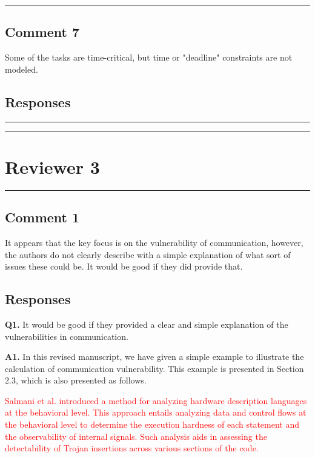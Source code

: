 \documentclass[10pt,journal, compsoc]{IEEEtran}
\begin{document}

\noindent\rule[0.25\baselineskip]{252pt}{1pt}


\subsection*{Comment 7}
Some of the tasks are time-critical, but time or "deadline" constraints are not modeled.

\subsection*{Responses}



\noindent\rule[0.25\baselineskip]{252pt}{1pt}

\noindent\rule[0.25\baselineskip]{252pt}{1pt}





\vspace*{3em}


\section*{{\Large Reviewer 3}}

\noindent\rule[0.25\baselineskip]{252pt}{1pt}

\subsection*{Comment 1}
It appears that the key focus is on the vulnerability of communication, however, the authors do not clearly describe with a simple explanation of what sort of issues these could be. It would be good if they did provide that.

\subsection*{Responses}

\textbf{Q1.} It would be good if they provided a clear and simple explanation of the vulnerabilities in communication.

\vspace*{1em}

\textbf{A1.} In this revised manuscript, we have given a simple example to illustrate the calculation of communication vulnerability. This example is presented in Section 2.3, which is also presented as follows.

\textcolor{red}{Salmani et al. \cite{conference:HS} introduced a method for analyzing hardware description languages at the behavioral level. This approach entails analyzing data and control flows at the behavioral level to determine the execution hardness of each statement and the observability of internal signals. Such analysis aids in assessing the detectability of Trojan insertions across various sections of the code.}
\end{document}
